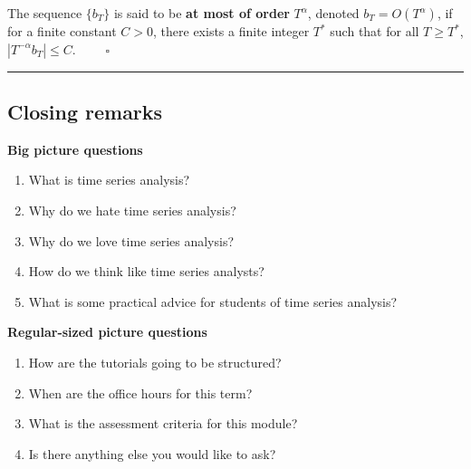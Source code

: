 \documentclass[
  letterpaper,
  DIV=11,
  numbers=noendperiod]{scrartcl}
\newcommand{\slidelabel}[1]{{\color{embernavy}\bfseries\large #1\par\vspace{5pt}}}
\begin{document}
\begin{tcolorbox}[enhanced jigsaw, arc=.35mm, bottomrule=.15mm, bottomtitle=1mm, breakable, colback=white, colbacktitle=quarto-callout-note-color!10!white, colframe=quarto-callout-note-color-frame, coltitle=black, left=2mm, leftrule=.75mm, opacityback=0, opacitybacktitle=0.6, rightrule=.15mm, title=\textcolor{quarto-callout-note-color}{\faInfo}\hspace{0.5em}{Definition --- Big-O notation}, titlerule=0mm, toprule=.15mm, toptitle=1mm]

The sequence \(\{b_T\}\) is said to be \textbf{at most of order}
\(T^\alpha\), denoted \(b_T = O(T^\alpha)\), if for a finite constant
\(C > 0\), there exists a finite integer \(T^*\) such that for all
\(T \geq T^*\), \(|T^{-\alpha}b_T| \leq C\). \(\qquad\square\)

\end{tcolorbox}

\begin{center}\rule{0.5\linewidth}{0.5pt}\end{center}

\subsection{Closing remarks}\label{closing-remarks}

\begin{slidebox}

\slidelabel{Big picture questions}

\begin{enumerate}
\def\labelenumi{(\roman{enumi})}
\item
  What is time series analysis?
\item
  Why do we hate time series analysis?
\item
  Why do we love time series analysis?
\item
  How do we think like time series analysts?
\item
  What is some practical advice for students of time series analysis?
\end{enumerate}

\end{slidebox}

\begin{slidebox}

\slidelabel{Regular-sized picture questions}

\begin{enumerate}
\def\labelenumi{(\roman{enumi})}
\item
  How are the tutorials going to be structured?
\item
  When are the office hours for this term?
\item
  What is the assessment criteria for this module?
\item
  Is there anything else you would like to ask?
\end{enumerate}

\end{slidebox}
\end{document}
